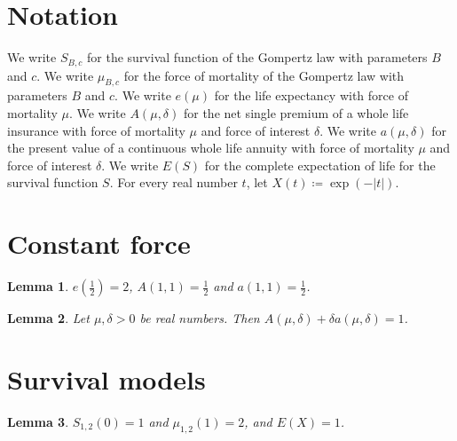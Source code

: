 \documentclass{article}
\newtheorem{lemma}{Lemma}
\begin{document}
\section{Notation}

We write $S_{B,c}$ for the survival function of the Gompertz law with parameters $B$ and $c$.
We write $\mu_{B,c}$ for the force of mortality of the Gompertz law with parameters $B$ and $c$.
We write $e(\mu)$ for the life expectancy with force of mortality $\mu$.
We write $A(\mu,\delta)$ for the net single premium of a whole life insurance with force of mortality $\mu$ and force of interest $\delta$.
We write $a(\mu,\delta)$ for the present value of a continuous whole life annuity with force of mortality $\mu$ and force of interest $\delta$.
We write $E(S)$ for the complete expectation of life for the survival function $S$.
For every real number $t$, let $X(t)\coloneqq\exp(-|t|)$.

\section{Constant force}

\begin{lemma}\label{constant}
$e(\frac12)=2$, $A(1,1)=\frac12$ and $a(1,1)=\frac12$.
\end{lemma}

\begin{lemma}\label{identity}
Let $\mu,\delta>0$ be real numbers. Then $A(\mu,\delta)+\delta a(\mu,\delta)=1$.
\end{lemma}

\section{Survival models}

\begin{lemma}\label{gompertz}
$S_{1,2}(0)=1$ and $\mu_{1,2}(1)=2$, and $E(X)=1$.
\end{lemma}
\end{document}
